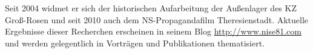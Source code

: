 \documentclass[a4paper,12pt,ngerman,
]{nisebook}
\begin{document}
Seit 2004 widmet er sich der historischen Aufarbeitung der Außenlager des KZ Groß-Rosen und seit 2010 auch dem NS-Propagandafilm Theresienstadt. Aktuelle Ergebnisse dieser Recherchen erscheinen in seinem Blog \url{http://www.nise81.com} und werden gelegentlich in Vorträgen und Publikationen thematisiert.
\end{document}
